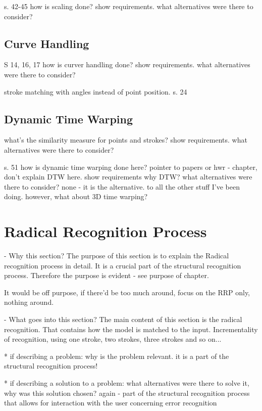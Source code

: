 s. 42-45
how is scaling done?
show requirements.
what alternatives were there to consider?

\subsection{Curve Handling}
\label{sec:hwre:curvehandling}

S 14, 16, 17
how is curver handling done?
show requirements.
what alternatives were there to consider?

stroke matching with angles instead of point position.
s. 24

\subsection{Dynamic Time Warping}
\label{sec:hwre:dynamictimewarping}

what's the similarity measure for
points and strokes?
show requirements.
what alternatives were there to consider?

s. 51
how is dynamic time warping done here?
pointer to papers or hwr - chapter, don't explain DTW here.
show requirements
why DTW?
what alternatives were there to consider?
none - it is the alternative.
to all the other stuff I've been doing.
however, what about 3D time warping?


\section{Radical Recognition Process}
\label{sec:hwre:radicalrecognitionprocess}

- Why this section? 
  The purpose of this section is to explain the Radical recognition process in
  detail. It is a crucial part of the structural recognition process.
  Therefore the purpose is evident - see purpose of chapter.

  It would be off purpose, if there'd be too much around,
  focus on the RRP only, nothing around.

- What goes into this section?
  The main content of this section is the radical recognition.
  That contains how the model is matched to the input.
  Incrementality of recognition, using one stroke, two strokes,
  three strokes and so on...

  * if describing a problem: why is the problem relevant.
    it is a part of the structural recognition process!

  * if describing a solution to a problem: what alternatives were
    there to solve it, why was this solution chosen? 
    again - part of the structural recognition process that allows for
    interaction with the user concerning error recognition

